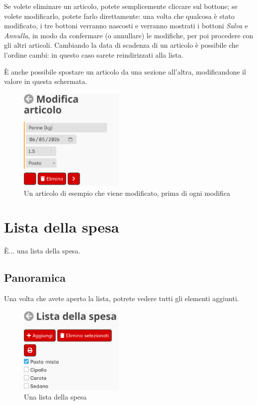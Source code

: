 \documentclass[12pt, a4paper]{report}
\begin{document}
    Se volete eliminare un articolo, potete semplicemente cliccare sul bottone; se volete modificarlo, potete farlo direttamente: una volta che
    qualcosa è stato modificato, i tre bottoni verranno nascosti e verranno mostrati i bottoni \emph{Salva} e \emph{Annulla}, in modo da confermare
    (o annullare) le modifiche, per poi procedere con gli altri articoli. Cambiando la data di scadenza di un articolo è possibile che l'ordine
	cambi: in questo caso sarete reindirizzati alla lista.

	\label{movearticle}È anche possibile spostare un articolo da una sezione all'altra, modificandone il valore in questa schermata.

    \begin{figure}[H]
        \centering
        \includegraphics[width=0.45\textwidth]{assets/it/article.png}
        \caption{Un articolo di esempio che viene modificato, prima di ogni modifica}
    \end{figure}



    \chapter{Lista della spesa}

    È... una lista della spesa.

    \section{Panoramica}

    Una volta che avete aperto la lista, potrete vedere tutti gli elementi aggiunti.

    \begin{figure}[H]
        \centering
        \includegraphics[width=0.45\textwidth]{assets/it/shopping_list.png}
        \caption{Una lista della spesa}
    \end{figure}
\end{document}
